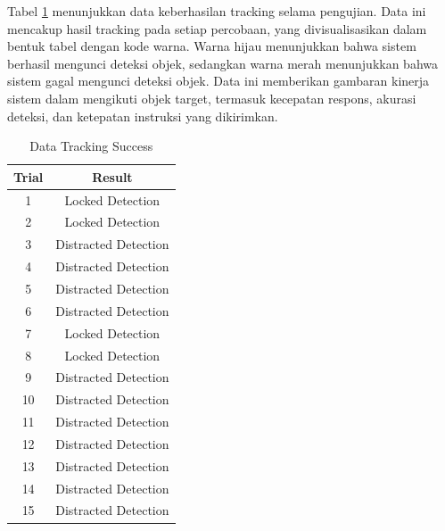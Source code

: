 Tabel \ref{tab:tracking_success} menunjukkan data keberhasilan tracking selama pengujian. Data ini mencakup hasil tracking pada setiap percobaan, yang divisualisasikan dalam bentuk tabel dengan kode warna. Warna hijau menunjukkan bahwa sistem berhasil mengunci deteksi objek, sedangkan warna merah menunjukkan bahwa sistem gagal mengunci deteksi objek. Data ini memberikan gambaran kinerja sistem dalam mengikuti objek target, termasuk kecepatan respons, akurasi deteksi, dan ketepatan instruksi yang dikirimkan.

\begin{table}[H]
    \centering
    \caption{Data Tracking Success}
    \label{tab:tracking_success}
    \begin{tabular}{|c|c|}
        \hline 
        \cellcolor[HTML]{C0C0C0}Trial & \cellcolor[HTML]{C0C0C0}Result \\ \hline
        1 & \cellcolor[HTML]{7cFF7c}Locked Detection \\ \hline
        2 & \cellcolor[HTML]{7cFF7c}Locked Detection \\ \hline
        3 & \cellcolor[HTML]{FF7c7c}Distracted Detection \\ \hline
        4 & \cellcolor[HTML]{FF7c7c}Distracted Detection \\ \hline
        5 & \cellcolor[HTML]{FF7c7c}Distracted Detection \\ \hline
        6 & \cellcolor[HTML]{FF7c7c}Distracted Detection \\ \hline
        7 & \cellcolor[HTML]{7cFF7c}Locked Detection \\ \hline
        8 & \cellcolor[HTML]{7cFF7c}Locked Detection \\ \hline
        9 & \cellcolor[HTML]{FF7c7c}Distracted Detection \\ \hline 
        10 & \cellcolor[HTML]{FF7c7c}Distracted Detection \\ \hline
        11 & \cellcolor[HTML]{FF7c7c}Distracted Detection \\ \hline
        12 & \cellcolor[HTML]{FF7c7c}Distracted Detection \\ \hline
        13 & \cellcolor[HTML]{FF7c7c}Distracted Detection \\ \hline
        14 & \cellcolor[HTML]{FF7c7c}Distracted Detection \\ \hline
        15 & \cellcolor[HTML]{FF7c7c}Distracted Detection \\ \hline
    \end{tabular}
\end{table}

